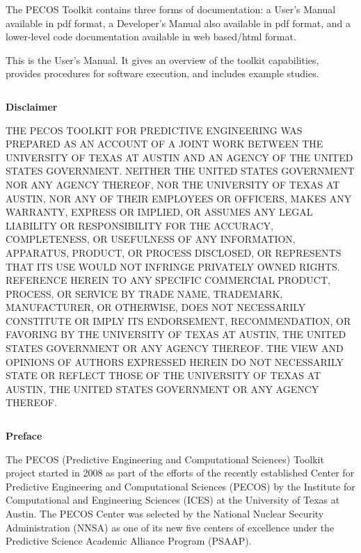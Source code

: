 The PECOS Toolkit contains three forms of documentation:
a User's Manual available in pdf format,
a Developer's Manual also available in pdf format, and
a lower-level code documentation available in web based/html format.

This is the User's Manual.
It gives an overview of the toolkit capabilities,
provides procedures for software execution, and includes example studies.

\clearpage
$~$\\

\clearpage
\centerline{\Large\bf Disclaimer}
$~$\\
    THE PECOS TOOLKIT FOR PREDICTIVE ENGINEERING WAS PREPARED AS AN ACCOUNT OF A JOINT WORK
    BETWEEN THE UNIVERSITY OF TEXAS AT AUSTIN AND AN AGENCY OF THE UNITED STATES GOVERNMENT.
    NEITHER THE UNITED STATES GOVERNMENT NOR ANY AGENCY THEREOF, NOR THE UNIVERSITY OF TEXAS
    AT AUSTIN, NOR ANY OF THEIR EMPLOYEES OR OFFICERS, MAKES ANY WARRANTY, EXPRESS OR IMPLIED,
    OR ASSUMES ANY LEGAL LIABILITY OR RESPONSIBILITY FOR THE ACCURACY, COMPLETENESS, OR
    USEFULNESS OF ANY INFORMATION, APPARATUS, PRODUCT, OR PROCESS DISCLOSED, OR REPRESENTS
    THAT ITS USE WOULD NOT INFRINGE PRIVATELY OWNED RIGHTS. REFERENCE HEREIN TO ANY SPECIFIC
    COMMERCIAL PRODUCT, PROCESS, OR SERVICE BY TRADE NAME, TRADEMARK, MANUFACTURER, OR OTHERWISE,
    DOES NOT NECESSARILY CONSTITUTE OR IMPLY ITS ENDORSEMENT, RECOMMENDATION, OR FAVORING BY
    THE UNIVERSITY OF TEXAS AT AUSTIN, THE UNITED STATES GOVERNMENT OR ANY AGENCY THEREOF.
    THE VIEW AND OPINIONS OF AUTHORS EXPRESSED HEREIN DO NOT NECESSARILY STATE OR REFLECT
    THOSE OF THE UNIVERSITY OF TEXAS AT AUSTIN, THE UNITED STATES GOVERNMENT OR ANY AGENCY
    THEREOF.

\clearpage
$~$\\

\clearpage
{\markboth{}{}
}
\tableofcontents


\clearpage
\thispagestyle{empty}
\centerline{\Large\bf Preface}
$~$\\
The PECOS (Predictive Engineering and Computational Sciences) Toolkit project started in 2008 as part
of the efforts of the recently established Center for Predictive Engineering and Computational Sciences (PECOS)
by the Institute for Computational and Engineering Sciences (ICES) at the University of Texas at Austin.
The PECOS Center was selected by the National Nuclear Security Administration (NNSA) as one of its new five centers of excellence
under the Predictive Science Academic Alliance Program (PSAAP).


